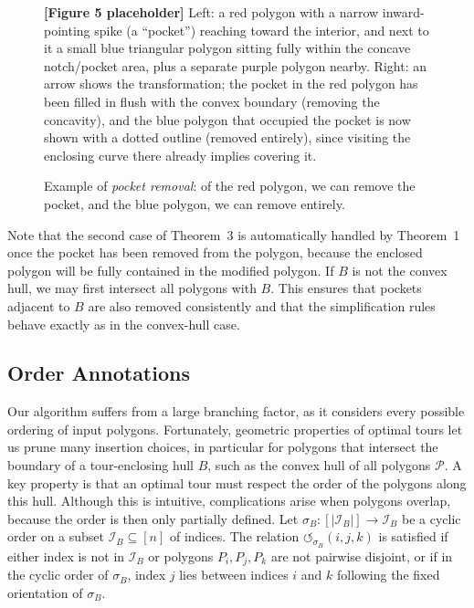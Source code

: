\documentclass[11pt,a4paper]{article}
\theoremstyle{plain}
\begin{document}
\begin{figure}[h]
\centering
\begin{figplaceholder}
\textbf{[Figure 5 placeholder]} Left: a red polygon with a narrow inward-pointing spike (a ``pocket'') reaching toward the interior, and next to it a small blue triangular polygon sitting fully within the concave notch/pocket area, plus a separate purple polygon nearby. Right: an arrow shows the transformation; the pocket in the red polygon has been filled in flush with the convex boundary (removing the concavity), and the blue polygon that occupied the pocket is now shown with a dotted outline (removed entirely), since visiting the enclosing curve there already implies covering it.
\end{figplaceholder}
\caption{Example of \emph{pocket removal}: of the red polygon, we can remove the pocket, and the blue polygon, we can remove entirely.}
\label{fig:5}
\end{figure}

Note that the second case of Theorem~3 is automatically handled by Theorem~1 once the pocket has been removed from the polygon, because the enclosed polygon will be fully contained in the modified polygon. If $B$ is not the convex hull, we may first intersect all polygons with $B$. This ensures that pockets adjacent to $B$ are also removed consistently and that the simplification rules behave exactly as in the convex-hull case.

\subsection{Order Annotations}
\label{sec:2.2}

Our algorithm suffers from a large branching factor, as it considers every possible ordering of input polygons. Fortunately, geometric properties of optimal tours let us prune many insertion choices, in particular for polygons that intersect the boundary of a tour-enclosing hull $B$, such as the convex hull of all polygons $\mathcal{P}$. A key property is that an optimal tour must respect the order of the polygons along this hull. Although this is intuitive, complications arise when polygons overlap, because the order is then only partially defined. Let $\sigma_B : [|\mathcal{I}_B|] \to \mathcal{I}_B$ be a cyclic order on a subset $\mathcal{I}_B \subseteq [n]$ of indices. The relation $\circlearrowleft_{\sigma_B}(i,j,k)$ is satisfied if either index is not in $\mathcal{I}_B$ or polygons $P_i, P_j, P_k$ are not pairwise disjoint, or if in the cyclic order of $\sigma_B$, index $j$ lies between indices $i$ and $k$ following the fixed orientation of $\sigma_B$.
\end{document}
